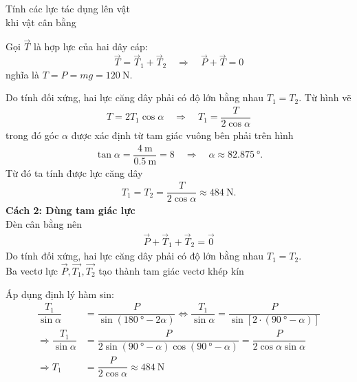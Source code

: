 \begin{dang}{Tính các lực tác dụng lên vật \\khi vật cân bằng}
{		Gọi $\vec T$ là hợp lực của hai dây cáp:
		$$\vec{T}=\vec{T}_1+\vec{T}_2\quad\Rightarrow\quad \vec{P}+\vec{T}=0$$
		nghĩa là $T=P=mg=\SI{120}{\newton}$.
		
		Do tính đối xứng, hai lực căng dây phải có độ lớn bằng nhau $T_1=T_2$. Từ hình vẽ 
		\begin{align*}
			T=2T_1\cos \alpha\quad\Rightarrow\quad T_1=\dfrac{T}{2\cos\alpha}
		\end{align*}
		trong đó góc $\alpha$ được xác định từ tam giác vuông bên phải trên hình
		\begin{align*}
			\tan\alpha=\dfrac{\SI{4}{\meter}}{\SI{0.5}{\meter}}=8\quad\Rightarrow\quad \alpha\approx\SI{82.875}{\degree}. 
		\end{align*}
		Từ đó ta tính được lực căng dây
		\begin{align*}
			T_1=T_2=\dfrac{T}{2\cos\alpha}\approx \SI{484}{\newton}.
		\end{align*}		
	\textbf{Cách 2: Dùng tam giác lực}\\
	Đèn cân bằng nên
	\begin{align*}
		\vec{P}+\vec{T}_1+\vec{T}_2=\overrightarrow{0}
	\end{align*}
Do tính đối xứng, hai lực căng dây phải có độ lớn bằng nhau $T_1=T_2$.\\
Ba vectơ lực $\vec{P}, \overrightarrow{T_1}, \overrightarrow{T_2}$ tạo thành tam giác vectơ khép kín
	\begin{center}
\end{center}
Áp dụng định lý hàm sin:
\begin{align*}
	\dfrac{T_1}{\sin\alpha}&=\dfrac{P}{\sin\left(\SI{180}{\degree}-2\alpha\right)}\Leftrightarrow \dfrac{T_1}{\sin\alpha}=\dfrac{P}{\sin\left[2\cdot\left(\SI{90}{\degree}-\alpha\right)\right]}\\
	\Rightarrow \dfrac{T_1}{\sin\alpha}&=\dfrac{P}{2\sin\left(\SI{90}{\degree}-\alpha\right)\cos\left(\SI{90}{\degree}-\alpha\right)}=\dfrac{P}{2\cos\alpha\sin\alpha}\\
	\Rightarrow T_1&=\dfrac{P}{2\cos\alpha}\approx\SI{484}{\newton}
\end{align*}
	}
	
	
\end{dang}